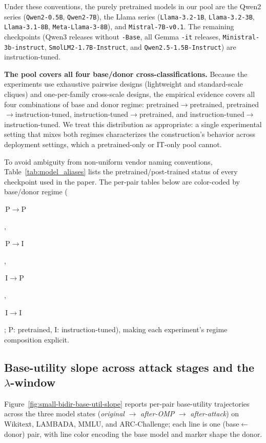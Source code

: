 \documentclass{article}
\theoremstyle{plain}
\theoremstyle{definition}
\theoremstyle{remark}
\begin{document}
Under these conventions, the purely pretrained models in our pool are the Qwen2 series (\texttt{Qwen2-0.5B}, \texttt{Qwen2-7B}), the Llama series (\texttt{Llama-3.2-1B}, \texttt{Llama-3.2-3B}, \texttt{Llama-3.1-8B}, \texttt{Meta-Llama-3-8B}), and \texttt{Mistral-7B-v0.1}. The remaining checkpoints (Qwen3 releases without \texttt{-Base}, all Gemma \texttt{-it} releases, \texttt{Ministral-3b-instruct}, \texttt{SmolLM2-1.7B-Instruct}, and \texttt{Qwen2.5-1.5B-Instruct}) are instruction-tuned.

\noindent\textbf{The pool covers all four base/donor cross-classifications.}
Because the experiments use exhaustive pairwise designs (lightweight and standard-scale cliques) and one-per-family cross-scale designs, the empirical evidence covers all four combinations of base and donor regime: pretrained$\to$pretrained, pretrained$\to$instruction-tuned, instruction-tuned$\to$pretrained, and instruction-tuned$\to$instruction-tuned. We treat this distribution as appropriate: a single experimental setting that mixes both regimes characterizes the construction's behavior across deployment settings, which a pretrained-only or IT-only pool cannot.

To avoid ambiguity from non-uniform vendor naming conventions, Table~\ref{tab:model_aliases} lists the pretrained/post-trained status of every checkpoint used in the paper. The per-pair tables below are color-coded by base/donor regime (\colorbox{rowPP}{\strut\,P$\to$P\,}, \colorbox{rowPI}{\strut\,P$\to$I\,}, \colorbox{rowIP}{\strut\,I$\to$P\,}, \colorbox{rowII}{\strut\,I$\to$I\,}; P: pretrained, I: instruction-tuned), making each experiment's regime composition explicit.

\subsection{Base-utility slope across attack stages and the $\lambda$-window}
\label{app:base_util_slope}
\label{app:lambda_window}

Figure~\ref{fig:small-bidir-base-util-slope} reports per-pair base-utility trajectories across the three model states (\emph{original} $\to$ \emph{after-OMP} $\to$ \emph{after-attack}) on Wikitext, LAMBADA, MMLU, and ARC-Challenge; each line is one (base$\leftarrow$donor) pair, with line color encoding the base model and marker shape the donor.
\end{document}

